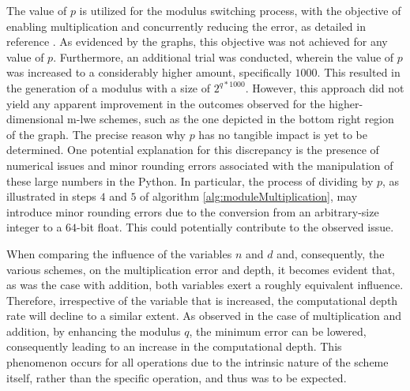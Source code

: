 The value of $p$ is utilized for the modulus switching process, with the objective of enabling multiplication and concurrently reducing the error, as detailed in reference \cite{bfv}. As evidenced by the graphs, this objective was not achieved for any value of $p$. Furthermore, an additional trial was conducted, wherein the value of $p$ was increased to a considerably higher amount, specifically $1000$. This resulted in the generation of a modulus with a size of $2^{q*1000}$. However, this approach did not yield any apparent improvement in the outcomes observed for the higher-dimensional m-lwe schemes, such as the one depicted in the bottom right region of the graph. The precise reason why $p$ has no tangible impact is yet to be determined. One potential explanation for this discrepancy is the presence of numerical issues and minor rounding errors associated with the manipulation of these large numbers in the Python. In particular, the process of dividing by $p$, as illustrated in steps $4$ and $5$ of algorithm \ref{alg:moduleMultiplication}, may introduce minor rounding errors due to the conversion from an arbitrary-size integer to a $64$-bit float. This could potentially contribute to the observed issue.

When comparing the influence of the variables $n$ and $d$ and, consequently, the various schemes, on the multiplication error and depth, it becomes evident that, as was the case with addition, both variables exert a roughly equivalent influence. Therefore, irrespective of the variable that is increased, the computational depth rate will decline to a similar extent. As observed in the case of multiplication and addition, by enhancing the modulus $q$, the minimum error can be lowered, consequently leading to an increase in the computational depth. This phenomenon occurs for all operations due to the intrinsic nature of the scheme itself, rather than the specific operation, and thus was to be expected.

